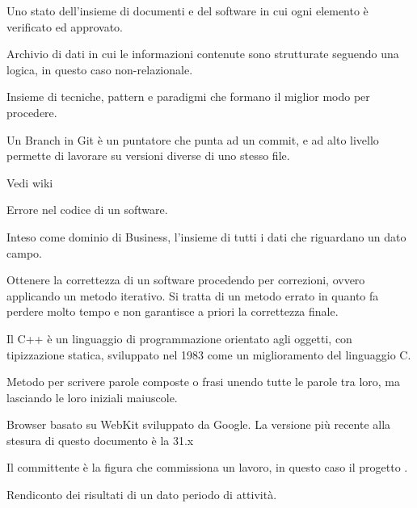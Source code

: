 
\begin{itemize}


Uno stato dell'insieme di documenti e del software in cui ogni elemento è verificato ed approvato.


Archivio di dati in cui le informazioni contenute sono strutturate seguendo una logica, in questo caso non-relazionale.


Insieme di tecniche, pattern e paradigmi che formano il miglior modo per procedere.


Un Branch in Git è un puntatore che punta ad un commit, e ad alto livello permette di lavorare su versioni diverse di uno stesso file.


Vedi wiki


Errore nel codice di un software.


Inteso come dominio di Business, l'insieme di tutti i dati che riguardano un dato campo.


Ottenere la correttezza di un software procedendo per correzioni, ovvero applicando un metodo iterativo. Si tratta di un metodo errato in quanto fa perdere molto tempo e non garantisce a priori la correttezza finale.

\end{itemize}


\begin{itemize}


Il C++ è un linguaggio di programmazione orientato agli oggetti, con tipizzazione statica, sviluppato nel 1983 come un miglioramento del linguaggio C.





Metodo per scrivere parole composte o frasi unendo tutte le parole tra loro, ma lasciando le loro iniziali maiuscole. \\


Browser basato su WebKit sviluppato da Google. La versione più recente alla stesura di questo documento è la 31.x \\


Il committente è la figura che commissiona un lavoro, in questo caso il progetto \ProjectName{}.


Rendiconto  dei risultati di un dato periodo di attività.

\end{itemize}

